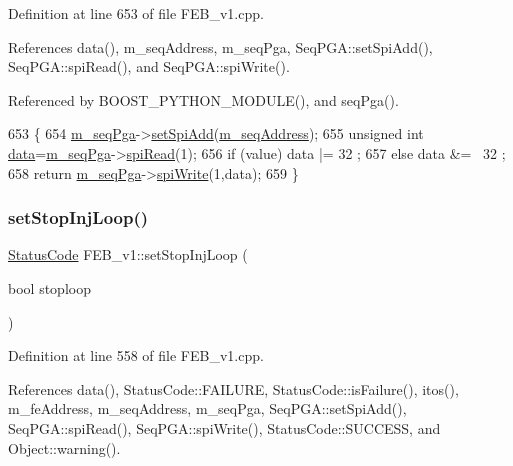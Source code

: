 Definition at line 653 of file F\+E\+B\+\_\+v1.\+cpp.



References data(), m\+\_\+seq\+Address, m\+\_\+seq\+Pga, Seq\+P\+G\+A\+::set\+Spi\+Add(), Seq\+P\+G\+A\+::spi\+Read(), and Seq\+P\+G\+A\+::spi\+Write().



Referenced by B\+O\+O\+S\+T\+\_\+\+P\+Y\+T\+H\+O\+N\+\_\+\+M\+O\+D\+U\+L\+E(), and seq\+Pga().


\begin{DoxyCode}
653                                             \{
654   \hyperlink{classFEB__v1_a6c7804ac86796f233a8393043adf2e77}{m\_seqPga}->\hyperlink{classSeqPGA_ac998ce3a6d9b5f2e88cc8393f8c1df53}{setSpiAdd}(\hyperlink{classFEB__v1_a1c1eb093fd1733b9510fcf8bc5c7ad08}{m\_seqAddress});
655   \textcolor{keywordtype}{unsigned} \textcolor{keywordtype}{int} \hyperlink{classFEB__v1_a6bca4320bd3bbbc32efc81097f33421a}{data}=\hyperlink{classFEB__v1_a6c7804ac86796f233a8393043adf2e77}{m\_seqPga}->\hyperlink{classSeqPGA_ab3d0e5e5d4014bc7a92588a76b8713d4}{spiRead}(1);
656   \textcolor{keywordflow}{if} (value)  data |= 32  ;
657   \textcolor{keywordflow}{else}        data &= ~32 ;
658   \textcolor{keywordflow}{return} \hyperlink{classFEB__v1_a6c7804ac86796f233a8393043adf2e77}{m\_seqPga}->\hyperlink{classSeqPGA_ad4421841ce4ce8b88ad13f63216f0743}{spiWrite}(1,data);
659 \}
\end{DoxyCode}
\mbox{\label{classFEB__v1_aaf8386be3d27ea22e389b0a6c7699af7}} 
\subsubsection{\texorpdfstring{set\+Stop\+Inj\+Loop()}{setStopInjLoop()}}
{\footnotesize\ttfamily \hyperlink{classStatusCode}{Status\+Code} F\+E\+B\+\_\+v1\+::set\+Stop\+Inj\+Loop (\begin{DoxyParamCaption}\item[{bool}]{stoploop }\end{DoxyParamCaption})}



Definition at line 558 of file F\+E\+B\+\_\+v1.\+cpp.



References data(), Status\+Code\+::\+F\+A\+I\+L\+U\+RE, Status\+Code\+::is\+Failure(), itos(), m\+\_\+fe\+Address, m\+\_\+seq\+Address, m\+\_\+seq\+Pga, Seq\+P\+G\+A\+::set\+Spi\+Add(), Seq\+P\+G\+A\+::spi\+Read(), Seq\+P\+G\+A\+::spi\+Write(), Status\+Code\+::\+S\+U\+C\+C\+E\+SS, and Object\+::warning().



